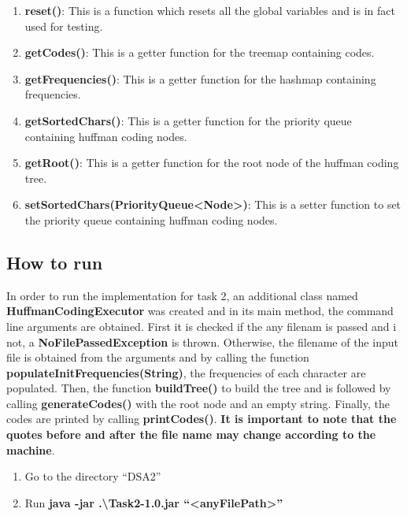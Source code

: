 \documentclass{article}
\newcommand{\quotes}[1]{``#1''}
\begin{document}
\begin{enumerate}
				\item \textbf{reset()}: This is a function which resets all the global variables and is in fact used for testing.
				
				\item \textbf{getCodes()}: This is a getter function for the treemap containing codes.
				\item \textbf{getFrequencies()}: This is a getter function for the hashmap containing frequencies.
				\item \textbf{getSortedChars()}: This is a getter function for the priority queue containing huffman coding nodes.
				\item \textbf{getRoot()}: This is a getter function for the root node of the huffman coding tree.
				\item \textbf{setSortedChars(PriorityQueue\textless Node\textgreater)}: This is a setter function to set the priority queue containing huffman coding nodes.
				
				

		\end{enumerate}
		
		\subsection{How to run}

In order to run the implementation for task 2, an additional class named \textbf{HuffmanCodingExecutor} was created and in its main method, the command line arguments are obtained. First it is checked if the any filenam is passed and i not, a \textbf{NoFilePassedException} is thrown. Otherwise, the filename of the input file is obtained from the arguments and by calling the function \textbf{populateInitFrequencies(String)}, the frequencies of each character are populated. Then, the function \textbf{buildTree()} to build the tree and is followed by calling \textbf{generateCodes()} with the root node and an empty string. Finally, the codes are printed by calling \textbf{printCodes()}. \textbf{It is important to note that the quotes before and after the file name may change according to the machine}.

\begin{enumerate}
\item Go to the directory \quotes{DSA2}
\item Run \textbf{java -jar .\textbackslash Task2-1.0.jar \quotes{\textless anyFilePath\textgreater}}
\end{enumerate}
\end{document}
